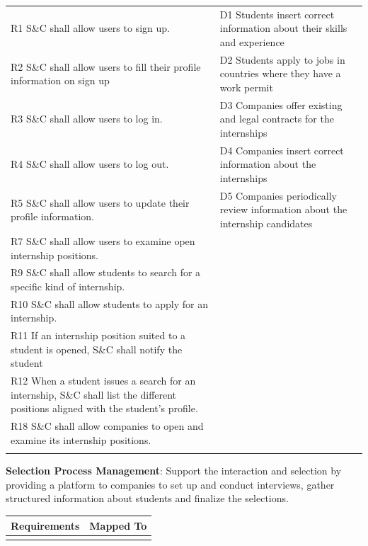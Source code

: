 \begin{enumerate}[label={[G\arabic*]}]
\begin{longtable}{|p{8cm}|p{8cm}|}
\hline
\endfoot

\hline
\endlastfoot
R1 S\&C shall allow users to sign up. & D1 Students insert correct information about their skills and experience \\
R2 S\&C shall allow users to fill their profile information on sign up & D2 Students apply to jobs in countries where they have a work permit \\
R3 S\&C shall allow users to log in. & D3 Companies offer existing and legal contracts for the internships \\
R4 S\&C shall allow users to log out. & D4 Companies insert correct information about the internships \\
R5 S\&C shall allow users to update their profile information. & D5 Companies periodically review information about the internship candidates \\
R7 S\&C shall allow users to examine open internship positions.  & \\
R9 S\&C shall allow students to search for a specific kind of internship.  & \\ 
R10 S\&C shall allow students to apply for an internship. & \\
R11 If an internship position suited to a student is opened, S\&C shall notify the student & \\
R12 When a student issues a search for an internship, S\&C shall list the different positions aligned with the student's profile.  & \\
R18 S\&C shall allow companies to open and examine its internship positions. & \\
\newpage
\end{longtable}
\item \textbf{Selection Process Management}: 
                Support the interaction and selection by providing a platform to companies to set up and conduct interviews, gather structured information about students and finalize the selections.

\begin{longtable}{|p{8cm}|p{8cm}|}
\hline
\rowcolor[HTML]{CFE2F3} 
\textbf{Requirements} & \textbf{Mapped To} \\
\hline
\endfirsthead

\hline
\endfoot

\hline
\endlastfoot


\end{longtable}
\end{enumerate}
